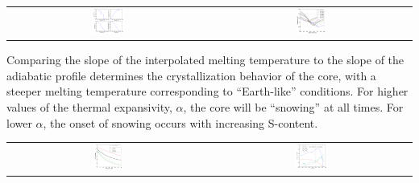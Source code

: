 \documentclass[landscape,a0b,final]{a0poster}
\begin{document}
\begin{multicols}{3}
\begin{center}
\begin{tabular}{cc}
 \includegraphics[width=0.165\textwidth]{profiles.png} &
 \includegraphics[width=0.15\textwidth]{Liquidus_model.png} \\
\end{tabular}
\label{interior_model}
\end{center}

Comparing the slope of the interpolated melting temperature to the slope of the
adiabatic profile determines the crystallization behavior of the core, with a
steeper melting temperature corresponding to  ``Earth-like'' conditions. For higher
values of the thermal expansivity, $\alpha$, the core will be ``snowing'' at all
times. For lower $\alpha$, the onset of snowing occurs with increasing S-content.

\columnbreak

\begin{center}
\begin{tabular}{cc}
 \includegraphics[width=0.15\textwidth]{clapeyron_1.png} &
 \includegraphics[width=0.165\textwidth]{core_energetics.png} \\
\end{tabular}
\label{core_energy}
\end{center}





\end{multicols}
\end{document}
